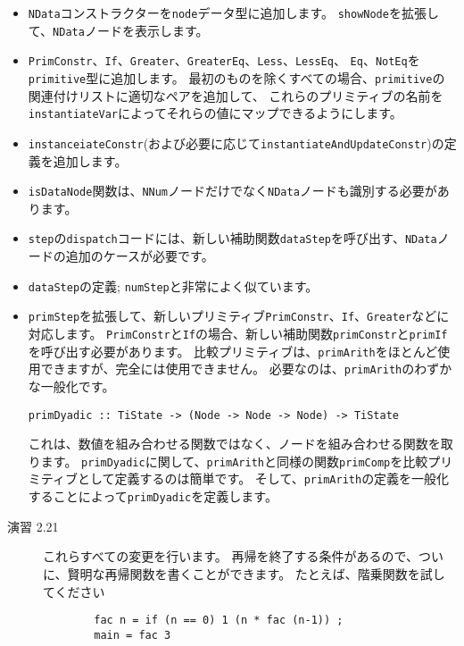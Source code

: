 \documentclass{jarticle}
\begin{document}
\begin{itemize}
	\item \texttt{NData}コンストラクターを\texttt{node}データ型に追加します。
	      \texttt{showNode}を拡張して、\texttt{NData}ノードを表示します。
	\item \texttt{PrimConstr}、\texttt{If}、\texttt{Greater}、\texttt{GreaterEq}、\texttt{Less}、\texttt{LessEq}、
	      \texttt{Eq}、\texttt{NotEq}を\texttt{primitive}型に追加します。
	      最初のものを除くすべての場合、\texttt{primitive}の関連付けリストに適切なペアを追加して、
	      これらのプリミティブの名前を\texttt{instantiateVar}によってそれらの値にマップできるようにします。
	\item \texttt{instanceiateConstr}(および必要に応じて\texttt{instantiateAndUpdateConstr})の定義を追加します。
	\item \texttt{isDataNode}関数は、\texttt{NNum}ノードだけでなく\texttt{NData}ノードも識別する必要があります。
	\item \texttt{step}の\texttt{dispatch}コードには、新しい補助関数\texttt{dataStep}を呼び出す、\texttt{NData}ノードの追加のケースが必要です。
	\item \texttt{dataStep}の定義; \texttt{numStep}と非常によく似ています。
	\item \texttt{primStep}を拡張して、新しいプリミティブ\texttt{PrimConstr}、\texttt{If}、\texttt{Greater}などに対応します。
	      \texttt{PrimConstr}と\texttt{If}の場合、新しい補助関数\texttt{primConstr}と\texttt{primIf}を呼び出す必要があります。
	      比較プリミティブは、\texttt{primArith}をほとんど使用できますが、完全には使用できません。
	      必要なのは、\texttt{primArith}のわずかな一般化です。
	      \begin{verbatim}
primDyadic :: TiState -> (Node -> Node -> Node) -> TiState
\end{verbatim}
	      これは、数値を組み合わせる関数ではなく、ノードを組み合わせる関数を取ります。
	      \texttt{primDyadic}に関して、\texttt{primArith}と同様の関数\texttt{primComp}を比較プリミティブとして定義するのは簡単です。
	      そして、\texttt{primArith}の定義を一般化することによって\texttt{primDyadic}を定義します。
\end{itemize}

\begin{description}
	\item[演習 2.21] これらすべての変更を行います。
		再帰を終了する条件があるので、ついに、賢明な再帰関数を書くことができます。
		たとえば、階乗関数を試してください
		\begin{verbatim}
        fac n = if (n == 0) 1 (n * fac (n-1)) ;
        main = fac 3
\end{verbatim}
\end{description}
\end{document}
